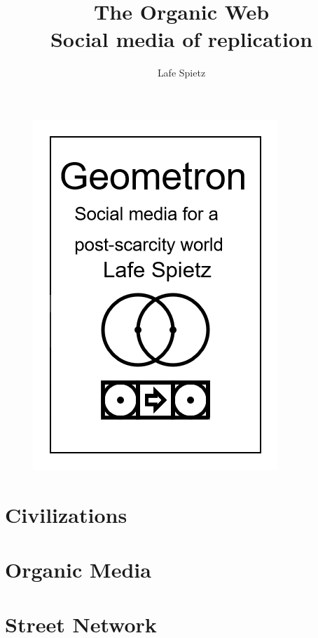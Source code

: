 \documentclass[ebook,12pt,openany]{memoir} %
\title{The Organic Web \\ Social media of replication}
\author{Lafe Spietz}
\begin{document}
\frontmatter
\begin{figure}[htbp]
\centering
\includegraphics{cover.png}
\end{figure}

\clearpage

\clearpage

\newpage
\thispagestyle{empty}
\mbox{}

\maketitle

\tableofcontents

\listoffigures 

%

\mainmatter

\chapter{Civilizations}

\chapter{Organic Media}

\chapter{Street Network}

\end{document}
